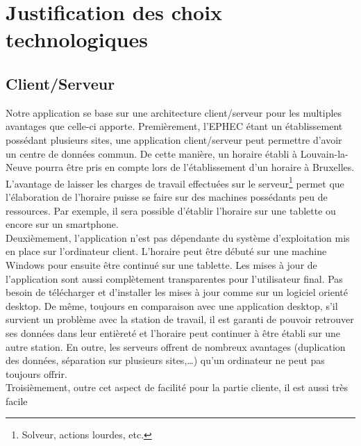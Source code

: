 
\chapter{Justification des choix technologiques}

\section{Client/Serveur}

Notre application se base sur une architecture client/serveur pour les multiples
avantages que celle-ci apporte.
\newline
\indent
Premièrement, l'EPHEC étant un établissement possédant plusieurs sites, une application client/serveur peut permettre d'avoir un centre de données  commun.
 \newline
 \indent
 De cette manière, un horaire établi à Louvain-la-Neuve pourra être pris en
 compte lors de l'établissement d'un horaire à Bruxelles.
L'avantage de laisser les charges de travail effectuées sur le serveur\footnote{Solveur, actions lourdes, etc.} permet que l'élaboration de l'horaire puisse se
faire sur des machines possédants peu de ressources. Par exemple, il sera
possible d'établir l'horaire sur une tablette ou encore sur un smartphone.\\
\newline
\indent
Deuxièmement, l'application n'est pas dépendante du système
d'exploitation mis en place sur l'ordinateur client. L'horaire peut être débuté sur
une machine Windows pour ensuite être continué sur une tablette.
Les mises à jour de l'application sont aussi complètement transparentes pour
l'utilisateur final. Pas besoin de télécharger et d'installer les mises à jour
comme sur un logiciel orienté desktop.
\newline
\indent
De même, toujours en comparaison avec une application desktop, s'il survient un
problème avec la station de travail, il est garanti de pouvoir retrouver ses
données dans leur entièreté et l'horaire peut continuer à être établi
sur une autre station. En outre, les serveurs offrent de nombreux avantages (duplication des
données, séparation sur plusieurs sites,…) qu'un ordinateur ne peut pas toujours offrir.\\
\newline
\indent
Troisièmement, outre cet aspect de facilité pour la partie cliente, il est aussi très facile

